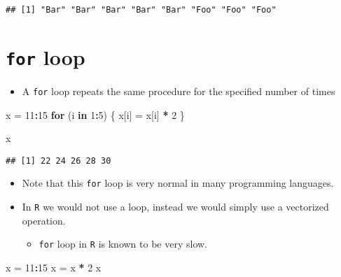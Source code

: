 \documentclass[]{book}
\newenvironment{Shaded}{\begin{snugshade}}{\end{snugshade}}
\newcommand{\ControlFlowTok}[1]{\textcolor[rgb]{0.13,0.29,0.53}{\textbf{#1}}}
\newcommand{\DecValTok}[1]{\textcolor[rgb]{0.00,0.00,0.81}{#1}}
\newcommand{\NormalTok}[1]{#1}
\newcommand{\OperatorTok}[1]{\textcolor[rgb]{0.81,0.36,0.00}{\textbf{#1}}}
\newcommand{\StringTok}[1]{\textcolor[rgb]{0.31,0.60,0.02}{#1}}
\providecommand{\tightlist}{%
  \setlength{\itemsep}{0pt}\setlength{\parskip}{0pt}}
\begin{document}
\begin{verbatim}
## [1] "Bar" "Bar" "Bar" "Bar" "Bar" "Foo" "Foo" "Foo"
\end{verbatim}

\hypertarget{for-loop}{%
\section{\texorpdfstring{\texttt{for} loop}{for loop}}\label{for-loop}}

\begin{itemize}
\tightlist
\item
  A \texttt{for} loop repeats the same procedure for the specified number of times
\end{itemize}

\begin{Shaded}
\begin{Highlighting}[]
\NormalTok{x =}\StringTok{ }\DecValTok{11}\OperatorTok{:}\DecValTok{15}
\ControlFlowTok{for}\NormalTok{ (i }\ControlFlowTok{in} \DecValTok{1}\OperatorTok{:}\DecValTok{5}\NormalTok{) \{}
\NormalTok{  x[i] =}\StringTok{ }\NormalTok{x[i] }\OperatorTok{*}\StringTok{ }\DecValTok{2}
\NormalTok{\}}

\NormalTok{x}
\end{Highlighting}
\end{Shaded}

\begin{verbatim}
## [1] 22 24 26 28 30
\end{verbatim}

\begin{itemize}
\tightlist
\item
  Note that this \texttt{for} loop is very normal in many programming languages.
\item
  In \texttt{R} we would not use a loop, instead we would simply use a vectorized operation.

  \begin{itemize}
  \tightlist
  \item
    \texttt{for} loop in \texttt{R} is known to be very slow.
  \end{itemize}
\end{itemize}

\begin{Shaded}
\begin{Highlighting}[]
\NormalTok{x =}\StringTok{ }\DecValTok{11}\OperatorTok{:}\DecValTok{15}
\NormalTok{x =}\StringTok{ }\NormalTok{x }\OperatorTok{*}\StringTok{ }\DecValTok{2}
\NormalTok{x}
\end{Highlighting}
\end{Shaded}
\end{document}
